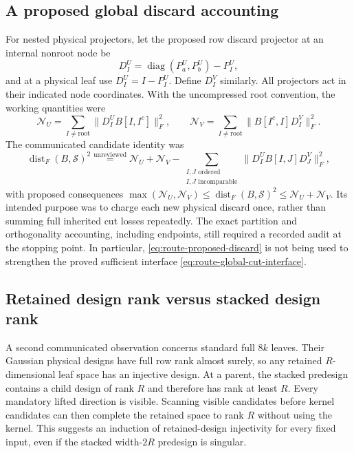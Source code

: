 \documentclass[11pt,oneside,openany,a4paper]{report}
\numberwithin{equation}{chapter}
\theoremstyle{definition}
\theoremstyle{remark}
\DeclareMathOperator{\diag}{diag}\DeclareMathOperator{\range}{range}
\begin{document}
\subsection{A proposed global discard accounting}

For nested physical projectors, let the proposed row discard projector
at an internal nonroot node be
\[
 D_I^U=\diag(P_a^U,P_b^U)-P_I^U,
\]
and at a physical leaf use $D_I^U=I-P_I^U$.  Define $D_I^V$ similarly.
All projectors act in their indicated node coordinates.  With the
uncompressed root convention, the working quantities were
\[
 \mathcal N_U=\sum_{I\ne\mathrm{root}}
       \lVert D_I^U B[I,I^c]\rVert_F^2,
 \qquad
 \mathcal N_V=\sum_{I\ne\mathrm{root}}
       \lVert B[I^c,I]D_I^V\rVert_F^2.
\]
The communicated candidate identity was
\begin{equation}
 \operatorname{dist}_F(B,\mathcal S)^2
 \mathrel{\stackrel{\text{unreviewed}}{=}}
 \mathcal N_U+\mathcal N_V
 -\sum_{\substack{I,J\text{ ordered}\\I,J\text{ incomparable}}}
       \lVert D_I^U B[I,J]D_J^V\rVert_F^2,
 \label{eq:route-proposed-discard}
\end{equation}
with proposed consequences
$\max(\mathcal N_U,\mathcal N_V)
\leq\operatorname{dist}_F(B,\mathcal S)^2
\leq\mathcal N_U+\mathcal N_V$.
Its intended purpose was to charge each new physical discard once,
rather than summing full inherited cut losses repeatedly.  The exact
partition and orthogonality accounting, including endpoints, still
required a recorded audit at the stopping point.  In particular,
\eqref{eq:route-proposed-discard} is not being used to strengthen the
proved sufficient interface \eqref{eq:route-global-cut-interface}.

\subsection{Retained design rank versus stacked design rank}

A second communicated observation concerns standard full $8k$ leaves.
Their Gaussian physical designs have full row rank almost surely, so
any retained $R$-dimensional leaf space has an injective design.  At a
parent, the stacked predesign contains a child design of rank $R$ and
therefore has rank at least $R$.  Every mandatory lifted direction is
visible.  Scanning visible candidates before kernel candidates can
then complete the retained space to rank $R$ without using the kernel.
This suggests an induction of retained-design injectivity for every
fixed input, even if the stacked width-$2R$ predesign is singular.
\end{document}
